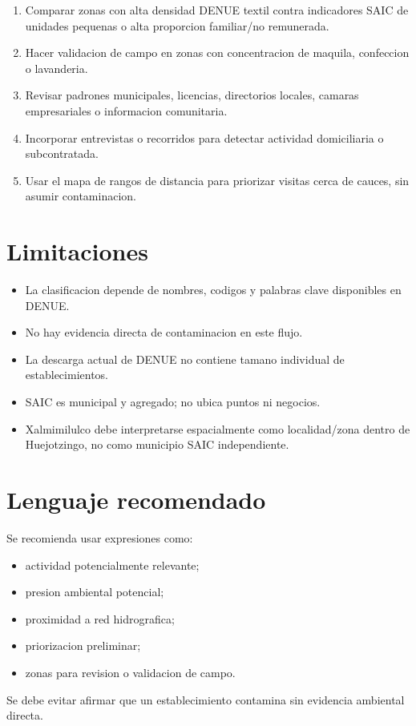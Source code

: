 \documentclass[11pt,letterpaper]{article}
\begin{document}
\begin{enumerate}
  \item Comparar zonas con alta densidad DENUE textil contra indicadores SAIC de unidades pequenas o alta proporcion familiar/no remunerada.
  \item Hacer validacion de campo en zonas con concentracion de maquila, confeccion o lavanderia.
  \item Revisar padrones municipales, licencias, directorios locales, camaras empresariales o informacion comunitaria.
  \item Incorporar entrevistas o recorridos para detectar actividad domiciliaria o subcontratada.
  \item Usar el mapa de rangos de distancia para priorizar visitas cerca de cauces, sin asumir contaminacion.
\end{enumerate}

\section{Limitaciones}

\begin{itemize}
  \item La clasificacion depende de nombres, codigos y palabras clave disponibles en DENUE.
  \item No hay evidencia directa de contaminacion en este flujo.
  \item La descarga actual de DENUE no contiene tamano individual de establecimientos.
  \item SAIC es municipal y agregado; no ubica puntos ni negocios.
  \item Xalmimilulco debe interpretarse espacialmente como localidad/zona dentro de Huejotzingo, no como municipio SAIC independiente.
\end{itemize}

\section{Lenguaje recomendado}

Se recomienda usar expresiones como:

\begin{itemize}
  \item actividad potencialmente relevante;
  \item presion ambiental potencial;
  \item proximidad a red hidrografica;
  \item priorizacion preliminar;
  \item zonas para revision o validacion de campo.
\end{itemize}

Se debe evitar afirmar que un establecimiento contamina sin evidencia ambiental directa.
\end{document}
